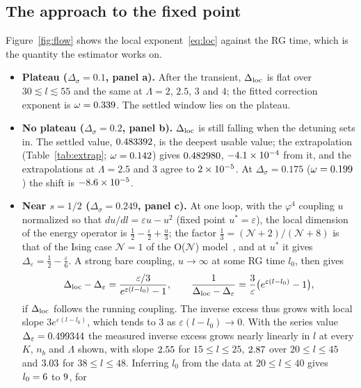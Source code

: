 \documentclass[10pt,a4paper]{article}
\newcommand{\Ds}{\Delta_\sigma}
\newcommand{\De}{\Delta_\varepsilon}
\newcommand{\Dloc}{\Delta_{\rm loc}}
\begin{document}
\subsection{The approach to the fixed point}\label{sec:approach}
Figure~\ref{fig:flow} shows the local exponent~\eqref{eq:loc} against the RG time, which is the quantity the estimator works on.
\begin{itemize}
\item \textbf{Plateau ($\Ds=0.1$, panel a).} After the transient, $\Dloc$ is flat over $30\lesssim l\lesssim55$ and the same at
  $\Lambda=2$, $2.5$, $3$ and $4$; the fitted correction exponent is $\omega=0.339$. The settled window lies on the plateau.
\item \textbf{No plateau ($\Ds=0.2$, panel b).} $\Dloc$ is still falling when the detuning sets in. The settled value,
  $0.483392$, is the deepest usable value; the extrapolation (Table~\ref{tab:extrap}; $\omega=0.142$) gives
  $0.482980$, $-4.1\times10^{-4}$ from it, and the extrapolations at $\Lambda=2.5$ and $3$ agree to $2\times10^{-5}$.
  At $\Ds=0.175$ ($\omega=0.199$) the shift is $-8.6\times10^{-5}$.
\item \textbf{Near $s=1/2$ ($\Ds=0.249$, panel c).} At one loop, with the $\varphi^4$ coupling $u$ normalized so that
  $du/dl=\varepsilon u-u^2$ (fixed point $u^*=\varepsilon$), the local dimension of the energy operator is
  $\frac12-\frac\varepsilon2+\frac u3$; the factor $\frac13=(\mathcal N+2)/(\mathcal N+8)$ is that of the Ising case $\mathcal N=1$
  of the O($\mathcal N$) model~\cite{Fisher1972}, and at $u^*$ it gives $\De=\frac12-\frac\varepsilon6$. A strong bare coupling,
  $u\to\infty$ at some RG time $l_0$, then gives
  \begin{equation}
  \Dloc-\De=\frac{\varepsilon/3}{e^{\varepsilon(l-l_0)}-1},\qquad \frac1{\Dloc-\De}=\frac3\varepsilon\big(e^{\varepsilon(l-l_0)}-1\big),
  \label{eq:oneloop}
  \end{equation}
  if $\Dloc$ follows the running coupling. The inverse excess thus grows with local slope $3e^{\varepsilon(l-l_0)}$, which tends to 3
  as $\varepsilon(l-l_0)\to0$. With the series value $\De=\nrgserTwoFortyNine$ the measured inverse excess grows nearly linearly in $l$
  at every $K$, $n_b$ and $\Lambda$ shown, with slope $2.55$ for $15\le l\le25$, $2.87$ over $20\le l\le45$ and
  $3.03$ for $38\le l\le48$. Inferring $l_0$ from the data at $20\le l\le40$ gives $l_0=6$ to $9$, for

\end{itemize}
\end{document}
